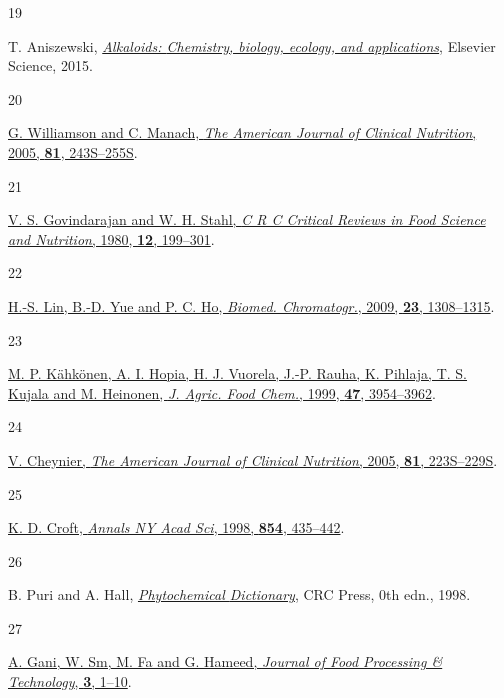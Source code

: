 \documentclass[
  letterpaper,
  DIV=11,
  numbers=noendperiod]{scrartcl}
\newlength{\cslhangindent}
\newlength{\csllabelwidth}
\newenvironment{CSLReferences}[2] %
 {\begin{list}{}{%
  \setlength{\itemindent}{0pt}
  \setlength{\leftmargin}{0pt}
  \setlength{\parsep}{0pt}
  \ifodd #1
   \setlength{\leftmargin}{\cslhangindent}
   \setlength{\itemindent}{-1\cslhangindent}
  \fi
  \setlength{\itemsep}{#2\baselineskip}}}
 {\end{list}}
\newcommand{\CSLLeftMargin}[1]{\parbox[t]{\csllabelwidth}{\strut#1\strut}}
\newcommand{\CSLRightInline}[1]{\parbox[t]{\linewidth - \csllabelwidth}{\strut#1\strut}}
\begin{document}
\begin{CSLReferences}{0}{0}
\CSLLeftMargin{19 }%
\CSLRightInline{T. Aniszewski,
\emph{\href{https://books.google.com.vn/books?id=tQ6dBAAAQBAJ}{Alkaloids:
{Chemistry}, biology, ecology, and applications}}, {Elsevier Science},
2015.}

\CSLLeftMargin{20 }%
\CSLRightInline{\href{https://doi.org/10.1093/ajcn/81.1.243S}{G.
Williamson and C. Manach, \emph{The American Journal of Clinical
Nutrition}, 2005, \textbf{81}, 243S--255S}.}

\CSLLeftMargin{21 }%
\CSLRightInline{\href{https://doi.org/10.1080/10408398009527278}{V. S.
Govindarajan and W. H. Stahl, \emph{C R C Critical Reviews in Food
Science and Nutrition}, 1980, \textbf{12}, 199--301}.}

\CSLLeftMargin{22 }%
\CSLRightInline{\href{https://doi.org/10.1002/bmc.1254}{H.-S. Lin, B.-D.
Yue and P. C. Ho, \emph{Biomed. Chromatogr.}, 2009, \textbf{23},
1308--1315}.}

\CSLLeftMargin{23 }%
\CSLRightInline{\href{https://doi.org/10.1021/jf990146l}{M. P. Kähkönen,
A. I. Hopia, H. J. Vuorela, J.-P. Rauha, K. Pihlaja, T. S. Kujala and M.
Heinonen, \emph{J. Agric. Food Chem.}, 1999, \textbf{47}, 3954--3962}.}

\CSLLeftMargin{24 }%
\CSLRightInline{\href{https://doi.org/10.1093/ajcn/81.1.223S}{V.
Cheynier, \emph{The American Journal of Clinical Nutrition}, 2005,
\textbf{81}, 223S--229S}.}

\CSLLeftMargin{25 }%
\CSLRightInline{\href{https://doi.org/10.1111/j.1749-6632.1998.tb09922.x}{K.
D. Croft, \emph{Annals NY Acad Sci}, 1998, \textbf{854}, 435--442}.}

\CSLLeftMargin{26 }%
\CSLRightInline{B. Puri and A. Hall,
\emph{\href{https://doi.org/10.4324/9780203483756}{Phytochemical
{Dictionary}}}, {CRC Press}, 0th edn., 1998.}

\CSLLeftMargin{27 }%
\CSLRightInline{\href{https://doi.org/10.4172/2157-7110.1000146}{A.
Gani, W. Sm, M. Fa and G. Hameed, \emph{Journal of Food Processing \&
Technology}, \textbf{3}, 1--10}.}


\end{CSLReferences}
\end{document}
